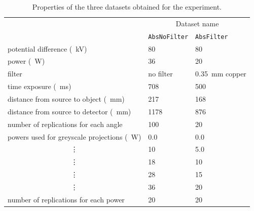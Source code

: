 \begin{table}
\centering
\begin{tabular}{l|ll}
                                                       & \multicolumn{2}{c}{Dataset name}                      \\
                                                       & \texttt{AbsNoFilter} & \texttt{AbsFilter}             \\ \hline
potential difference (\SI{}{\kilo\volt})               & 80                   & 80                             \\
power (\SI{}{\watt})                                   & 36                   & 20                             \\
filter                                                 & no filter            & \SI{0.35}{\milli\metre} copper \\
time exposure (\SI{}{\milli\second})                   & 708                  & 500                            \\
distance from source to object (\SI{}{\milli\metre})   & 217                  & 168                            \\
distance from source to detector (\SI{}{\milli\metre}) & 1178                 & 876                            \\
number of replications for each angle                  & 100                  & 20                             \\ \hline
powers used for greyscale projections (\SI{}{\watt})   & 0.0                  & 0.0                            \\
\multicolumn{1}{c|}{\vdots}                            & 10                   & 5.0                            \\
\multicolumn{1}{c|}{\vdots}                            & 18                   & 10                             \\
\multicolumn{1}{c|}{\vdots}                            & 28                   & 15                             \\
\multicolumn{1}{c|}{\vdots}                            & 36                   & 20                             \\
number of replications for each power                  & 20                   & 20                             
\end{tabular}
\caption{Properties of the three datasets obtained for the experiment.}
\label{table:data_dataset}
\end{table}


